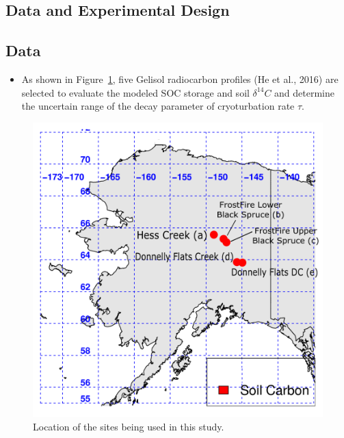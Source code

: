 \documentclass[portait,custom]{sciposter}
\begin{document}
\begin{multicols*}{4}
%


\section*{Data and Experimental Design}
\subsection*{Data}

  \begin{itemize}
    \item As shown in Figure~\ref{fig:nee}, five Gelisol radiocarbon profiles (He et al., 2016) are selected to evaluate the modeled SOC storage and soil $\delta ^{14}C$ and determine the uncertain range of the decay parameter of cryoturbation rate $\tau$.
  \end{itemize}
\begin{figure}
   \centering
   \includegraphics[width=0.5\columnwidth]{new_figures/Study_sites_annotated.png}
   \caption{Location of the sites being used in this study.}\label{fig:nee}
\end{figure}


\end{multicols*}
\end{document}
